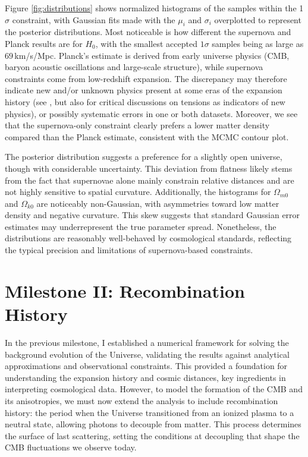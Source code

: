 \documentclass{aa}
\numberwithin{equation}{section}
\numberwithin{table}{section}
\numberwithin{figure}{section}
\begin{document}
Figure \ref{fig:distributions} shows normalized histograms of the samples within the 1$\sigma$ constraint, with Gaussian fits made with the $\mu_i$ and $\sigma_i$ overplotted to represent the posterior distributions. Most noticeable is how different the supernova and Planck results are for $H_0$, with the smallest accepted $1\sigma$ samples being as large as $69\,$km/s/Mpc. Planck's estimate is derived from early universe physics (CMB, baryon acoustic oscillations and large-scale structure), while supernova constraints come from low-redshift expansion. The discrepancy may therefore indicate new and/or unknown physics present at some eras of the expansion history (see \cite{JWST}, but also \cite{tensions} for critical discussions on tensions as indicators of new physics), or possibly systematic errors in one or both datasets. Moreover, we see that the supernova-only constraint clearly prefers a lower matter density compared than the Planck estimate, consistent with the MCMC contour plot.

The posterior distribution suggests a preference for a slightly open universe, though with considerable uncertainty. This deviation from flatness likely stems from the fact that supernovae alone mainly constrain relative distances and are not highly sensitive to spatial curvature. Additionally, the histograms for $\Omega_{m0}$ and $\Omega_{k0}$ are noticeably non-Gaussian, with asymmetries toward low matter density and negative curvature. This skew suggests that standard Gaussian error estimates may underrepresent the true parameter spread. Nonetheless, the distributions are reasonably well-behaved by cosmological standards, reflecting the typical precision and limitations of supernova-based constraints.



\section{Milestone II: Recombination History}\label{sec: milestone II}
In the previous milestone, I established a numerical framework for solving the background evolution of the Universe, validating the results against analytical approximations and observational constraints. This provided a foundation for understanding the expansion history and cosmic distances, key ingredients in interpreting cosmological data. However, to model the formation of the CMB and its anisotropies, we must now extend the analysis to include recombination history: the period when the Universe transitioned from an ionized plasma to a neutral state, allowing photons to decouple from matter. This process determines the surface of last scattering, setting the conditions at decoupling that shape the CMB fluctuations we observe today.  
\end{document}
